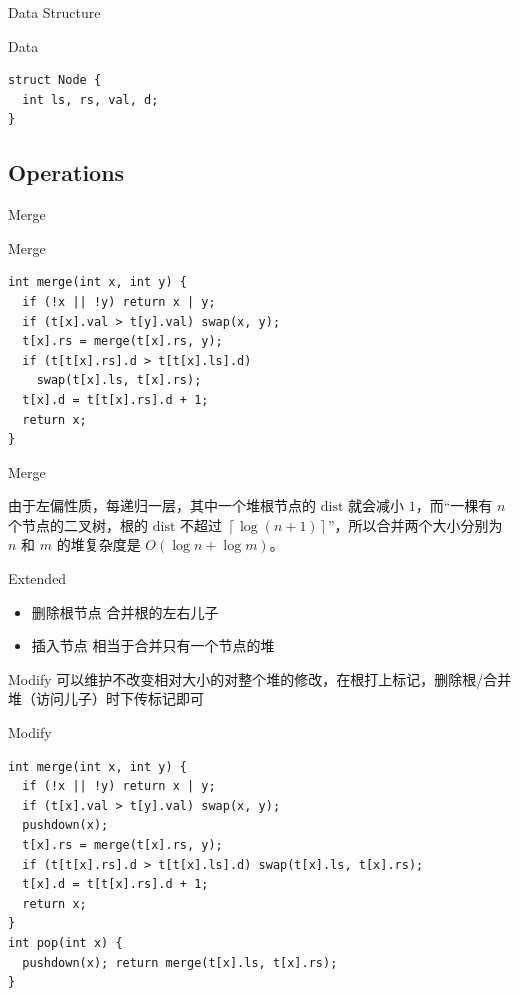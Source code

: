 \documentclass{beamer}
\begin{document}
\begin{frame}[fragile]{Data Structure}
   \begin{block}{Data}
        \begin{lstlisting}
struct Node {
  int ls, rs, val, d;
}
        \end{lstlisting}
   \end{block}
\end{frame}

\subsection{Operations}
\begin{frame}[fragile]{Merge}
   \begin{block}{Merge}
        \begin{lstlisting}
int merge(int x, int y) { 
  if (!x || !y) return x | y;
  if (t[x].val > t[y].val) swap(x, y); 
  t[x].rs = merge(t[x].rs, y); 
  if (t[t[x].rs].d > t[t[x].ls].d)
    swap(t[x].ls, t[x].rs); 
  t[x].d = t[t[x].rs].d + 1; 
  return x;
}
        \end{lstlisting}
   \end{block}
\end{frame}

\begin{frame}{Merge}

由于左偏性质，每递归一层，其中一个堆根节点的 $\mathrm{dist}$ 就会减小 $1$，而“一棵有 $n$ 个节点的二叉树，根的 $\mathrm{dist}$ 不超过 $\left\lceil\log (n+1)\right\rceil$”，所以合并两个大小分别为 $n$ 和 $m$ 的堆复杂度是 $O(\log n+\log m)$。

\begin{block}{Extended}
\begin{itemize}
    \item 删除根节点 \pause 合并根的左右儿子
    \item 插入节点 \pause 相当于合并只有一个节点的堆
\end{itemize}
\end{block}
    
\end{frame}

\begin{frame}[fragile]{Modify}
   可以维护不改变相对大小的对整个堆的修改，在根打上标记，删除根/合并堆（访问儿子）时下传标记即可
   
   \begin{block}{Modify}
        \begin{lstlisting}
int merge(int x, int y) {
  if (!x || !y) return x | y;
  if (t[x].val > t[y].val) swap(x, y);
  pushdown(x);
  t[x].rs = merge(t[x].rs, y);
  if (t[t[x].rs].d > t[t[x].ls].d) swap(t[x].ls, t[x].rs);
  t[x].d = t[t[x].rs].d + 1;
  return x;
}
int pop(int x) {
  pushdown(x); return merge(t[x].ls, t[x].rs);
}
        \end{lstlisting}
   \end{block}
\end{frame}
\end{document}

